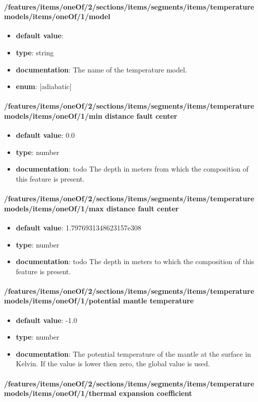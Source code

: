 \paragraph{/features/items/oneOf/2/sections/items/segments/items/temperature models/items/oneOf/1/model}
\begin{itemize}\item {\bf default value}: 
\item {\bf type}: string
\item {\bf documentation}: The name of the temperature model.
\item {\bf enum}: [adiabatic]\end{itemize}\paragraph{/features/items/oneOf/2/sections/items/segments/items/temperature models/items/oneOf/1/min distance fault center}
\begin{itemize}\item {\bf default value}: 0.0
\item {\bf type}: number
\item {\bf documentation}: todo The depth in meters from which the composition of this feature is present.
\end{itemize}\paragraph{/features/items/oneOf/2/sections/items/segments/items/temperature models/items/oneOf/1/max distance fault center}
\begin{itemize}\item {\bf default value}: 1.7976931348623157e308
\item {\bf type}: number
\item {\bf documentation}: todo The depth in meters to which the composition of this feature is present.
\end{itemize}\paragraph{/features/items/oneOf/2/sections/items/segments/items/temperature models/items/oneOf/1/potential mantle temperature}
\begin{itemize}\item {\bf default value}: -1.0
\item {\bf type}: number
\item {\bf documentation}: The potential temperature of the mantle at the surface in Kelvin. If the value is lower then zero, the global value is used.
\end{itemize}\paragraph{/features/items/oneOf/2/sections/items/segments/items/temperature models/items/oneOf/1/thermal expansion coefficient}
